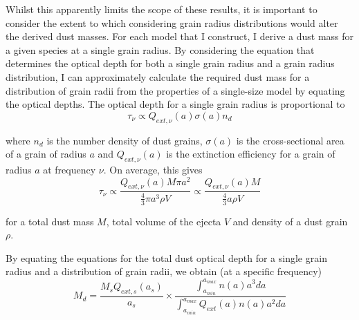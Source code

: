 Whilst this apparently limits the scope of these results, it is important to consider the extent to which considering grain radius distributions would alter the derived dust masses.  For each model that I construct, I derive a dust mass for a given species at a single grain radius.  By considering the equation that determines the optical depth for both a single grain radius and a grain radius distribution, I can 
approximately calculate the required dust mass for a distribution of grain radii from the properties of a single-size model by equating the optical depths.  The optical depth for a single grain radius is proportional to 
\begin{equation}
\tau_{\nu} \propto Q_{ext,\nu}(a)  \sigma(a) n_d
\end{equation}

\noindent where $n_d$ is the number density of dust grains, $\sigma(a)$ is the cross-sectional area of a grain of radius $a$ and $Q_{ext,\nu}(a)$ is the extinction efficiency for a grain of radius $a$ at frequency $\nu$.  On average, this gives
\begin{equation}
\tau_\nu \propto \frac{Q_{ext,\nu}(a) M \pi a^2}{\frac{4}{3} \pi a^3 \rho V} \propto \frac{Q_{ext,\nu}(a) M}{\frac{4}{3} a \rho V}
\end{equation}

\noindent for a total dust mass $M$, total volume of the ejecta $V$ and density of a dust grain $\rho$.

By equating the equations for the total dust optical depth for a single grain radius and a distribution of grain radii, we obtain (at a specific frequency)
\begin{equation}
\label{distn_conv}
M_{d}= \frac{M_s Q_{ext,s}(a_s)}{a_s} \times \frac{\int^{a_{max}}_{a_{min}} n(a) a^3 da}{\int^{a_{max}}_{a_{min}} Q_{ext}(a) n(a) a^2 da}
\end{equation}

